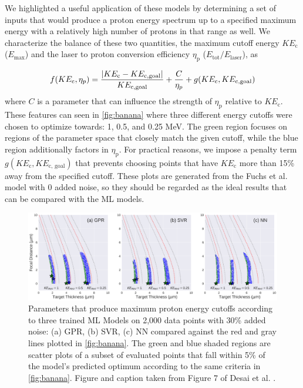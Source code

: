 We highlighted a useful application of these models by determining a set of inputs that would produce a proton energy spectrum up to a specified maximum energy with a relatively high number of protons in that range as well. We characterize the balance of these two quantities, the maximum cutoff energy $KE_\text{c}$ ($E_\text{max}$) and the laser to proton conversion efficiency $\eta_\text{p}$ ($E_\text{tot} / E_\text{laser}$), as 

\begin{equation}
	f(KE_{\rm c},\eta_{p}) = \frac{|KE_{\rm c} - KE_{\rm c,goal}|}{KE_{\rm c, goal}} + \frac{C}{\eta_{p}} + g( KE_{\rm c},KE_{\rm c,goal})  \\ \label{eq:fuchsv1_function}
\end{equation}
where $C$ is a parameter that can influence the strength of $\eta_\text{p}$ relative to $KE_\text{c}$. These features can seen in \autoref{fig:banana} where three different energy cutoffs were chosen to optimize towards: 1, 0.5, and 0.25 MeV. The green region focuses on regions of the parameter space that closely match the given cutoff, while the blue region additionally factors in $\eta_\text{p}$. For practical reasons, we impose a penalty term $g(KE_\text{c}, KE_\text{c, goal})$ that prevents choosing points that have $KE_\text{c}$ more than 15\% away from the specified cutoff. These plots are generated from the Fuchs et al. model with 0 added noise, so they should be regarded as the ideal results that can be compared with the \gls{ML} models.

\begin{figure}
	\centering 
	\includegraphics[width=0.95\linewidth]{planning/images/paper1/model_optim_noise=30_pts=2000.pdf}
	\caption{Parameters that produce maximum proton energy cutoffs according to three trained ML Models on 2,000 data points with 30\% added noise: (a) GPR, (b) SVR, (c) NN compared against the red and gray lines plotted in \autoref{fig:banana}. The green and blue shaded regions are scatter plots of a subset of evaluated points that fall within 5\% of the model's predicted optimum according to the same criteria in \autoref{fig:banana}. Figure and caption taken from Figure 7 of Desai et al. \cite{Desai_2024_CPP}.}
	\label{fig:banana3}
\end{figure}

